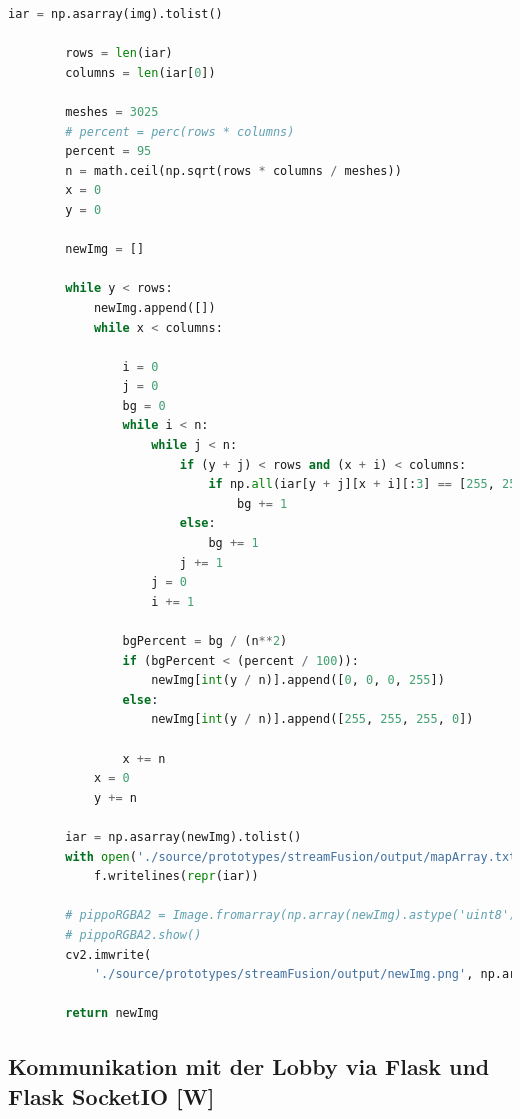 \begin{lstlisting}[language=Python,label=lst:umsetzung:getArray,firstnumber=21]
        iar = np.asarray(img).tolist()

        rows = len(iar)
        columns = len(iar[0])

        meshes = 3025
        # percent = perc(rows * columns)
        percent = 95
        n = math.ceil(np.sqrt(rows * columns / meshes))
        x = 0
        y = 0

        newImg = []

        while y < rows:
            newImg.append([])
            while x < columns:

                i = 0
                j = 0
                bg = 0
                while i < n:
                    while j < n:
                        if (y + j) < rows and (x + i) < columns:
                            if np.all(iar[y + j][x + i][:3] == [255, 255, 255], 0):
                                bg += 1
                        else:
                            bg += 1
                        j += 1
                    j = 0
                    i += 1

                bgPercent = bg / (n**2)
                if (bgPercent < (percent / 100)):
                    newImg[int(y / n)].append([0, 0, 0, 255])
                else:
                    newImg[int(y / n)].append([255, 255, 255, 0])

                x += n
            x = 0
            y += n

        iar = np.asarray(newImg).tolist()
        with open('./source/prototypes/streamFusion/output/mapArray.txt', 'w') as f:
            f.writelines(repr(iar))

        # pippoRGBA2 = Image.fromarray(np.array(newImg).astype('uint8'), mode='RGBA')
        # pippoRGBA2.show()
        cv2.imwrite(
            './source/prototypes/streamFusion/output/newImg.png', np.array(newImg))

        return newImg

\end{lstlisting}

\subsection{Kommunikation mit der Lobby via Flask und Flask SocketIO [W]} \label{PythonSocket}

